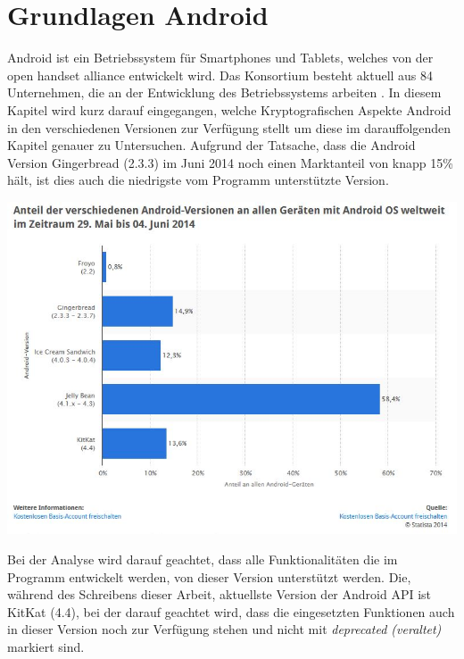 \documentclass[10pt, a4paper,headsepline]{scrreprt}
\begin{document}
\chapter{Grundlagen Android}
Android ist ein Betriebssystem für Smartphones und Tablets, welches von der open handset alliance entwickelt wird. Das Konsortium besteht aktuell aus 84 Unternehmen, die an der Entwicklung des Betriebssystems arbeiten \cite{website:oha-main}. 
In diesem Kapitel wird kurz darauf eingegangen, welche Kryptografischen Aspekte Android in den verschiedenen Versionen zur Verfügung stellt um diese im darauffolgenden Kapitel genauer zu Untersuchen. Aufgrund der Tatsache, dass die Android Version Gingerbread (2.3.3) im Juni 2014 noch einen Marktanteil von knapp 15\% hält, ist dies auch die niedrigste vom Programm unterstützte Version. \\

\begin{center}
\includegraphics[scale=0.6]{android_version_marktanteil.JPG} 
\end{center}
Bei der Analyse wird darauf geachtet, dass alle Funktionalitäten die im Programm entwickelt werden, von dieser Version unterstützt werden. Die, während des Schreibens dieser Arbeit, aktuellste Version der Android API ist KitKat (4.4), bei der darauf geachtet wird, dass die eingesetzten Funktionen auch in dieser Version noch zur Verfügung stehen und nicht mit \textit{deprecated (veraltet)} markiert sind.
\end{document}
